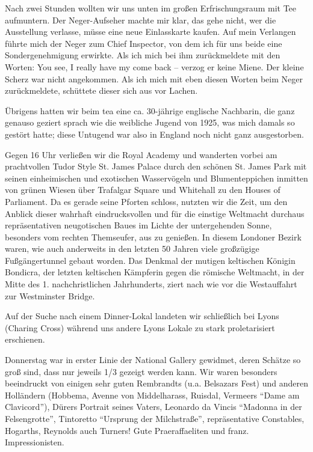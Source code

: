 \documentclass[a5paper,pagesize,10pt,twoside=true]{scrbook}
\begin{document}
Nach zwei Stunden wollten wir uns unten im großen Erfrischungsraum mit Tee aufmuntern. Der Neger-Aufseher machte mir klar, das gehe nicht, wer die Ausstellung verlasse, müsse eine neue Einlasskarte kaufen. Auf mein Verlangen führte mich der Neger zum Chief Inspector, von dem ich für uns beide eine Sondergenehmigung erwirkte. Als ich mich bei ihm zurückmeldete mit den Worten: You see, I really have my come back -- verzog er keine Miene. Der kleine Scherz war nicht angekommen. Als ich mich mit eben diesen Worten beim Neger zurückmeldete, schüttete dieser sich aus vor Lachen.

Übrigens hatten wir beim tea eine ca. 30-jährige englische Nachbarin, die ganz genauso geziert sprach wie die weibliche Jugend von 1925, was mich damals so gestört hatte; diese Untugend war also in England noch nicht ganz ausgestorben.

Gegen 16 Uhr verließen wir die Royal Academy und wanderten vorbei am prachtvollen Tudor Style St. James Palace durch den schönen St. James Park mit seinen einheimischen und exotischen Wasservögeln und Blumenteppichen inmitten von grünen Wiesen über Trafalgar Square und Whitehall zu den Houses of Parliament. Da es gerade seine Pforten schloss, nutzten wir die Zeit, um den Anblick dieser wahrhaft eindrucksvollen und für die einstige Weltmacht durchaus repräsentativen neugotischen Baues im Lichte der untergehenden Sonne, besonders vom rechten Themseufer, aus zu genießen. In diesem Londoner Bezirk waren, wie auch anderweits in den letzten 50 Jahren viele großzügige Fußgängertunnel gebaut worden. Das Denkmal der mutigen keltischen Königin Bondicra, der letzten keltischen Kämpferin gegen die römische Weltmacht, in der Mitte des 1. nachchristlichen Jahrhunderts, ziert nach wie vor die Westauffahrt zur Westminster Bridge.

Auf der Suche nach einem Dinner-Lokal landeten wir schließlich bei Lyons (Charing Cross) während uns andere Lyons Lokale zu stark proletarisiert erschienen.

Donnerstag war in erster Linie der National Gallery gewidmet, deren Schätze so groß sind, dass nur jeweils 1/3 gezeigt werden kann. Wir waren besonders beeindruckt von einigen sehr guten Rembrandts (u.a. Belsazars Fest) und anderen Holländern (Hobbema, Avenne von Middelharass, Ruisdal, Vermeers \enquote{Dame am Clavicord}), Dürers Portrait seines Vaters, Leonardo da Vincis \enquote{Madonna in der Felsengrotte}, Tintoretto \enquote{Ursprung der Milchstraße}, repräsentative Constables, Hogarths, Reynolds auch Turners! Gute Praeraffaeliten und franz. Impressionisten.
\end{document}
